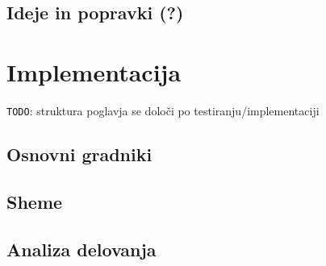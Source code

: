\documentclass[a4paper, 12pt]{article}
\newcommand{\todo}{\texttt{TODO}} %
\begin{document}
\subsection{Ideje in popravki (?)}



\section{Implementacija}

\todo: struktura poglavja se določi po testiranju/implementaciji

\subsection{Osnovni gradniki}

\subsection{Sheme}

\subsection{Analiza delovanja}
\end{document}
